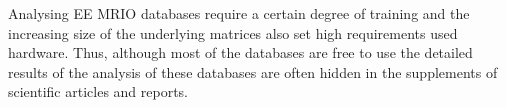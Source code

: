 Analysing EE MRIO databases require a certain degree of training and the
increasing size of the underlying matrices also set high requirements used hardware. Thus, although most of the databases are free to use the detailed results of the analysis of these databases are often hidden in the supplements of scientific articles and reports.